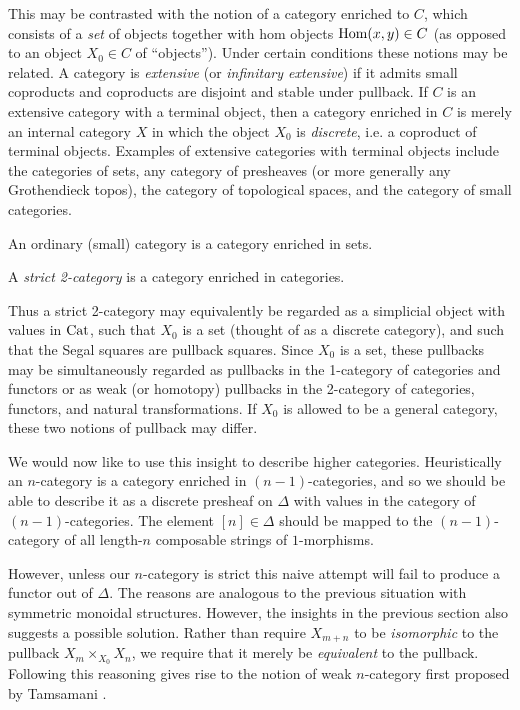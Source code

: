 \documentclass{amsart}
\begin{document}
This may be contrasted with the notion of a category enriched to $C$, which consists of a {\em set} of objects together with hom objects $\operatorname{Hom}(x,y) \in C$ (as opposed to an object $X_0 \in C$ of ``objects''). Under certain conditions these notions may be related. A category is {\em extensive} (or {\em infinitary extensive}) if it admits small coproducts and coproducts are disjoint and stable under pullback. If $C$ is an extensive category with a terminal object, then a category enriched in $C$ is merely an internal category $X$ in which the object $X_0$ is {\em discrete}, i.e. a coproduct of terminal objects. Examples of extensive categories with terminal objects include the categories of sets, any category of presheaves (or more generally any Grothendieck topos), the category of topological spaces, and the category of small categories. 

\begin{example}
	An ordinary (small) category is a category enriched in sets.
\end{example}

\begin{example}
	A {\em strict 2-category} is a category enriched in categories.
\end{example}

Thus a strict 2-category may equivalently be regarded as a simplicial object with values in $\mathrm{Cat}$, such that $X_0$ is a set (thought of as a discrete category), and such that the Segal squares are pullback squares. Since $X_0$ is a set, these pullbacks may be simultaneously regarded as pullbacks in the 1-category of categories and functors or as weak (or homotopy) pullbacks in the 2-category of categories, functors, and natural transformations. If $X_0$ is allowed to be a general category, these two notions of pullback may differ. 



We would now like to use this insight to describe higher categories.  Heuristically an $n$-category is a category enriched in $(n-1)$-categories, and so we should be able to describe it as a discrete presheaf on $\Delta$ with values in the category of $(n-1)$-categories.  The element $[n] \in \Delta$ should be mapped to the $(n-1)$-category of all length-$n$ composable strings of $1$-morphisms. 

However, unless our $n$-category is strict this naive attempt will fail to produce a functor out of $\Delta$. The reasons are analogous to the previous situation with symmetric monoidal structures. However, the insights in the previous section also suggests a possible solution. Rather than require $X_{m+n}$ to be {\em isomorphic} to the pullback $X_m \times_{X_0} X_n$, we require that it merely be {\em equivalent} to the pullback. 
Following this reasoning gives rise to the notion of weak $n$-category first proposed by Tamsamani \cite{Tamsamani:thesis}.   
\end{document}
